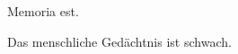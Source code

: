 \documentclass{scrbook}
\begin{document}
\begin{pairs}

\begin{Leftside}
\beginnumbering
\pstart
Memoria   est.
\pend
\endnumbering
\end{Leftside}

\begin{Rightside}
\beginnumbering
\pstart
Das menschliche Gedächtnis ist schwach.
\pend
\endnumbering
\end{Rightside}

\Columns
\end{pairs}
\end{document}
